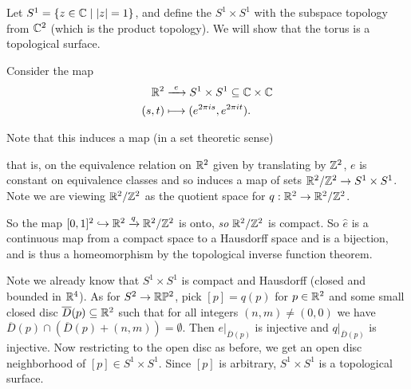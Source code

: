 \documentclass[a4paper]{scrartcl}
\begin{document}
\begin{example}[Torus]
    Let $S^1 = \{z \in \mathbb{C} \mid |z| = 1\}$, and define the  $S^1 \times S^1$ with the subspace topology from $\mathbb{C}^2$ (which is the product topology). We will show that the torus is a topological surface.

    Consider the map
    \begin{align*}
        \mathbb{R}^2 &\xrightarrow{\ e\ } S^1 \times S^1 \subseteq \mathbb{C} \times \mathbb{C} \\
        (s, t) & \longmapsto (e^{2\pi i s}, e^{2 \pi i t}).
    \end{align*}

    Note that this induces a map (in a set theoretic sense)
    \begin{center}
    \end{center}
    that is, on the equivalence relation on $\mathbb{R}^2$ given by translating by $\mathbb{Z}^2$, $e$ is constant on equivalence classes and so induces a map of sets $\mathbb{R}^2/\mathbb{Z}^2 \rightarrow S^1 \times S^1$. Note we are viewing $\mathbb{R}^2/\mathbb{Z}^2$ as the quotient space for $q: \mathbb{R}^2 \rightarrow \mathbb{R}^2/\mathbb{Z}^2$.

    So the map $[0, 1]^2 \hookrightarrow \mathbb{R}^2 \xrightarrow{q} \mathbb{R}^2/\mathbb{Z}^2$ is onto, \emph{so} $\mathbb{R}^2/\mathbb{Z}^2$ is compact. So $\hat{e}$ is a continuous map from a compact space to a Hausdorff space and is a bijection, and is thus a homeomorphism by the topological inverse function theorem.

    Note we already know that $S^1 \times S^1$ is compact and Hausdorff (closed and bounded in $\mathbb{R}^4$). As for $S^2 \rightarrow \mathbb{R}\mathbb{P}^2$, pick $[p] = q(p)$ for $p \in \mathbb{R}^2$ and some small closed disc $\overline{D}(p) \subseteq \mathbb{R}^2$ such that for all integers $(n, m) \neq (0,0)$ we have $\overline{D}(p) \cap (\overline{D}(p) + (n, m)) = \emptyset$.
    Then $e|_{\overline{D}(p)}$ is injective and $q|_{\overline{D}(p)}$ is injective.
    Now restricting to the open disc as before, we get an open disc neighborhood of $[p] \in S^1 \times S^1$.
    Since $[p]$ is arbitrary, $S^1 \times S^1$ is a topological surface.


\end{example}
\end{document}
